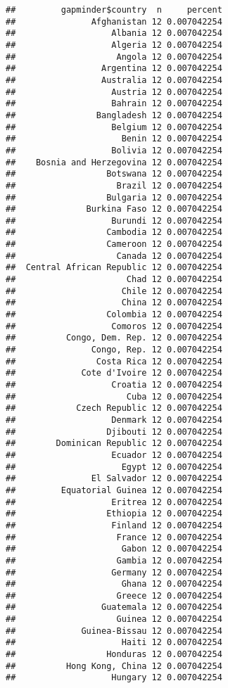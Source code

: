 \documentclass[
]{book}
\begin{document}
\begin{verbatim}
##         gapminder$country  n     percent
##               Afghanistan 12 0.007042254
##                   Albania 12 0.007042254
##                   Algeria 12 0.007042254
##                    Angola 12 0.007042254
##                 Argentina 12 0.007042254
##                 Australia 12 0.007042254
##                   Austria 12 0.007042254
##                   Bahrain 12 0.007042254
##                Bangladesh 12 0.007042254
##                   Belgium 12 0.007042254
##                     Benin 12 0.007042254
##                   Bolivia 12 0.007042254
##    Bosnia and Herzegovina 12 0.007042254
##                  Botswana 12 0.007042254
##                    Brazil 12 0.007042254
##                  Bulgaria 12 0.007042254
##              Burkina Faso 12 0.007042254
##                   Burundi 12 0.007042254
##                  Cambodia 12 0.007042254
##                  Cameroon 12 0.007042254
##                    Canada 12 0.007042254
##  Central African Republic 12 0.007042254
##                      Chad 12 0.007042254
##                     Chile 12 0.007042254
##                     China 12 0.007042254
##                  Colombia 12 0.007042254
##                   Comoros 12 0.007042254
##          Congo, Dem. Rep. 12 0.007042254
##               Congo, Rep. 12 0.007042254
##                Costa Rica 12 0.007042254
##             Cote d'Ivoire 12 0.007042254
##                   Croatia 12 0.007042254
##                      Cuba 12 0.007042254
##            Czech Republic 12 0.007042254
##                   Denmark 12 0.007042254
##                  Djibouti 12 0.007042254
##        Dominican Republic 12 0.007042254
##                   Ecuador 12 0.007042254
##                     Egypt 12 0.007042254
##               El Salvador 12 0.007042254
##         Equatorial Guinea 12 0.007042254
##                   Eritrea 12 0.007042254
##                  Ethiopia 12 0.007042254
##                   Finland 12 0.007042254
##                    France 12 0.007042254
##                     Gabon 12 0.007042254
##                    Gambia 12 0.007042254
##                   Germany 12 0.007042254
##                     Ghana 12 0.007042254
##                    Greece 12 0.007042254
##                 Guatemala 12 0.007042254
##                    Guinea 12 0.007042254
##             Guinea-Bissau 12 0.007042254
##                     Haiti 12 0.007042254
##                  Honduras 12 0.007042254
##          Hong Kong, China 12 0.007042254
##                   Hungary 12 0.007042254

\end{verbatim}
\end{document}
